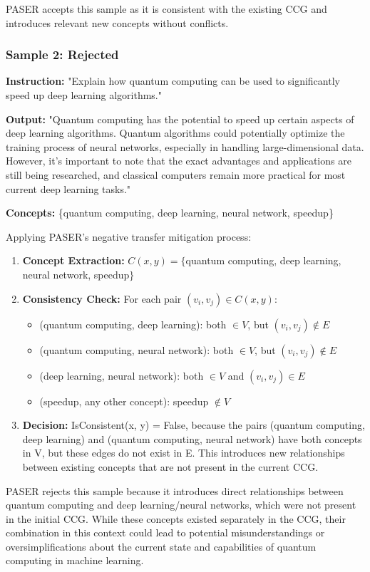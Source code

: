 PASER accepts this sample as it is consistent with the existing CCG and introduces relevant new concepts without conflicts.

\subsubsection{Sample 2: Rejected}
\textbf{Instruction:} "Explain how quantum computing can be used to significantly speed up deep learning algorithms."

\textbf{Output:} "Quantum computing has the potential to speed up certain aspects of deep learning algorithms. Quantum algorithms could potentially optimize the training process of neural networks, especially in handling large-dimensional data. However, it's important to note that the exact advantages and applications are still being researched, and classical computers remain more practical for most current deep learning tasks."

\textbf{Concepts:} \{quantum computing, deep learning, neural network, speedup\}

Applying PASER's negative transfer mitigation process:
\begin{enumerate}[leftmargin=*]
    \item \textbf{Concept Extraction:} 
    $C(x, y) = \{$quantum computing, deep learning, neural network, speedup$\}$

    \item \textbf{Consistency Check:}
    For each pair $(v_i, v_j) \in C(x, y)$:
    \begin{itemize}
        \item (quantum computing, deep learning): both $\in V$, but $(v_i, v_j) \notin E$
        \item (quantum computing, neural network): both $\in V$, but $(v_i, v_j) \notin E$
        \item (deep learning, neural network): both $\in V$ and $(v_i, v_j) \in E$
        \item (speedup, any other concept): speedup $\notin V$
    \end{itemize}

    \item \textbf{Decision:}
    IsConsistent(x, y) = False, because the pairs (quantum computing, deep learning) and (quantum computing, neural network) have both concepts in V, but these edges do not exist in E. This introduces new relationships between existing concepts that are not present in the current CCG.
\end{enumerate}
PASER rejects this sample because it introduces direct relationships between quantum computing and deep learning/neural networks, which were not present in the initial CCG. While these concepts existed separately in the CCG, their combination in this context could lead to potential misunderstandings or oversimplifications about the current state and capabilities of quantum computing in machine learning.

